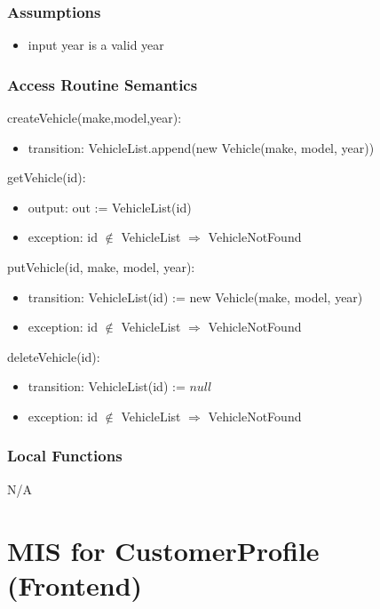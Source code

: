 \documentclass[12pt, titlepage]{article}
\begin{document}
        \subsubsection{Assumptions}
            \begin{itemize}
                \item input year is a valid year
            \end{itemize}
        \subsubsection{Access Routine Semantics}
            \noindent createVehicle(make,model,year):
            \begin{itemize}
                \item transition: VehicleList.append(new Vehicle(make, model, year))
            \end{itemize}
            \noindent getVehicle(id):
            \begin{itemize}
                \item output: out := VehicleList(id)
                \item exception: id $\notin$ VehicleList $\Rightarrow$ VehicleNotFound
            \end{itemize}
            \noindent putVehicle(id, make, model, year):
            \begin{itemize}
                \item transition: VehicleList(id) := new Vehicle(make, model, year)
                \item exception: id $\notin$ VehicleList $\Rightarrow$ VehicleNotFound
            \end{itemize} 
            \noindent deleteVehicle(id):
            \begin{itemize}
                \item transition: VehicleList(id) := $null$
                \item exception: id $\notin$ VehicleList $\Rightarrow$ VehicleNotFound
            \end{itemize}
        \subsubsection{Local Functions}
            N/A

\newpage
\section{MIS for CustomerProfile (Frontend)}
\end{document}
